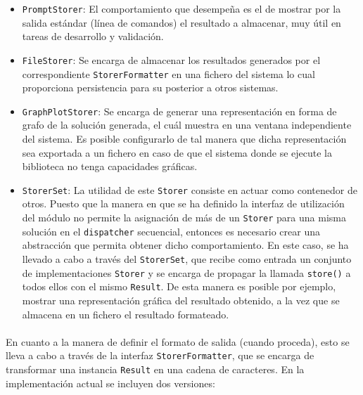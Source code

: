\documentclass{subfiles}
\begin{document}
          \begin{itemize}

            \item \texttt{PromptStorer}: El comportamiento que desempeña es el de mostrar por la salida estándar (línea de comandos) el resultado a almacenar, muy útil en tareas de desarrollo y validación.

            \item \texttt{FileStorer}: Se encarga de almacenar los resultados generados por el correspondiente \texttt{StorerFormatter} en una fichero del sistema lo cual proporciona persistencia para su posterior a otros sistemas.

            \item \texttt{GraphPlotStorer}: Se encarga de generar una representación en forma de grafo de la solución generada, el cuál muestra en una ventana independiente del sistema. Es posible configurarlo de tal manera que dicha representación sea exportada a un fichero en caso de que el sistema donde se ejecute la biblioteca no tenga capacidades gráficas.

            \item \texttt{StorerSet}: La utilidad de este \texttt{Storer} consiste en actuar como contenedor de otros. Puesto que la manera en que se ha definido la interfaz de utilización del módulo no permite la asignación de más de un \texttt{Storer} para una misma solución en el \texttt{dispatcher} secuencial, entonces es necesario crear una abstracción que permita obtener dicho comportamiento. En este caso, se ha llevado a cabo a través del \texttt{StorerSet}, que recibe como entrada un conjunto de implementaciones \texttt{Storer} y se encarga de propagar la llamada \verb|store()| a todos ellos con el mismo \texttt{Result}. De esta manera es posible por ejemplo, mostrar una representación gráfica del resultado obtenido, a la vez que se almacena en un fichero el resultado formateado.

          \end{itemize}

          \paragraph{}
          En cuanto a la manera de definir el formato de salida (cuando proceda), esto se lleva a cabo a través de la interfaz \texttt{StorerFormatter}, que se encarga de transformar una instancia \texttt{Result} en una cadena de caracteres. En la implementación actual se incluyen dos versiones:
\end{document}
